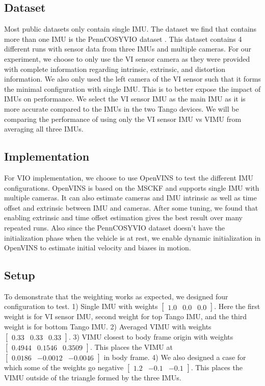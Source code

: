 \documentclass[conference]{IEEEtran}
\begin{document}
\subsection{Dataset}

Most public datasets only contain single IMU. The dataset we find that contains more than one IMU is the PennCOSYVIO dataset \cite{penncosyvio}. This dataset contains 4 different runs with sensor data from three IMUs and multiple cameras. For our experiment, we choose to only use the VI sensor camera as they were provided with complete information regarding intrinsic, extrinsic, and distortion information. We also only used the left camera of the VI sensor such that it forms the minimal configuration with single IMU. This is to better expose the impact of IMUs on performance. We select the VI sensor IMU as the main IMU as it is more accurate compared to the IMUs in the two Tango devices. We will be comparing the performance of using only the VI sensor IMU vs VIMU from averaging all three IMUs.

\subsection{Implementation}

For VIO implementation, we choose to use OpenVINS \cite{openvins} to test the different IMU configurations. OpenVINS is based on the MSCKF and supports single IMU with multiple cameras. It can also estimate cameras and IMU intrinsic as well as time offset and extrinsic between IMU and cameras. After some tuning, we found that enabling extrinsic and time offset estimation gives the best result over many repeated runs. Also since the PennCOSYVIO dataset doesn't have the initialization phase when the vehicle is at rest, we enable dynamic initialization in OpenVINS to estimate initial velocity and biases in motion.

\subsection{Setup}

To demonstrate that the weighting works as expected, we designed four configuration to test. 1) Single IMU with weights $[\begin{matrix} 1.0 & 0.0 & 0.0 \end{matrix}]$. Here the first weight is for VI sensor IMU, second weight for top Tango IMU, and the third weight is for bottom Tango IMU. 2) Averaged VIMU with weights $[\begin{matrix} 0.33 & 0.33 & 0.33 \end{matrix}]$. 3) VIMU closest to body frame origin with weights $[\begin{matrix} 0.4944 & 0.1546 & 0.3509 \end{matrix}]$. This places the VIMU at $[\begin{matrix} 0.0186 & -0.0012 & -0.0046 \end{matrix}]$ in body frame. 4) We also designed a case for which some of the weights go negative $[\begin{matrix} 1.2 & -0.1 & -0.1 \end{matrix}]$. This places the VIMU outside of the triangle formed by the three IMUs.
\end{document}
